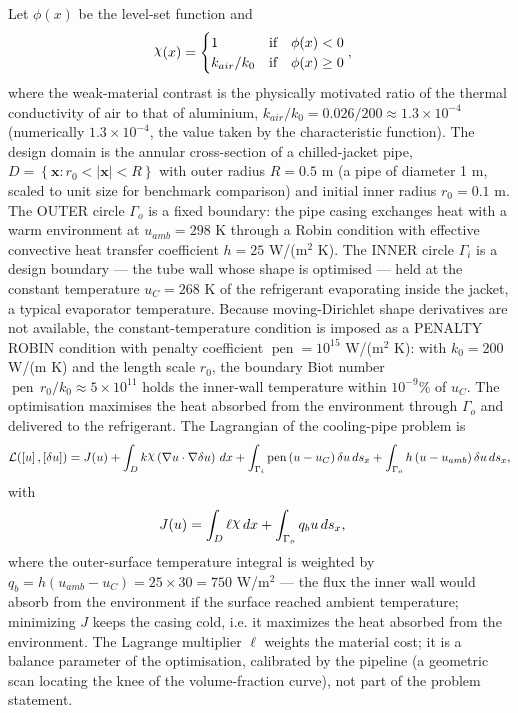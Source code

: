 \documentclass[preview]{standalone}
\let\oldcdot\cdot
\let\cdot\oldcdot
\begin{document}
Let $\phi(x)$ be the level-set function and
 \begin{align*}\raisebox{\depth}{$\chi$}(x) &= \begin{cases} 1 & \mbox{if}\quad \phi(x) < 0 \\ k_{air}/k_0 & \mbox{if}\quad \phi(x)  \ge 0 \end{cases},\end{align*}
where the weak-material contrast is the physically motivated ratio of the thermal conductivity of air to that of aluminium, $k_{air}/k_0 = 0.026/200 \approx 1.3 \times 10^{-4}$ (numerically $1.3 \times 10^{-4}$, the value taken by the characteristic function).
The design domain is the annular cross-section of a chilled-jacket pipe, $D = \left\{ \mathbf x : r_0 < \left|\mathbf x\right| < R \right\}$ with outer radius $R = 0.5$ m (a pipe of diameter 1 m, scaled to unit size for benchmark comparison) and initial inner radius $r_0 = 0.1$ m.  The OUTER circle $\Gamma_o$ is a fixed boundary: the pipe casing exchanges heat with a warm environment at $u_{amb} = 298$ K through a Robin condition with effective convective heat transfer coefficient $h = 25$ W/(m$^{2}$ K).  The INNER circle $\Gamma_i$ is a design boundary — the tube wall whose shape is optimised — held at the constant temperature $u_C = 268$ K of the refrigerant evaporating inside the jacket, a typical evaporator temperature.  Because moving-Dirichlet shape derivatives are not available, the constant-temperature condition is imposed as a PENALTY ROBIN condition with penalty coefficient $\operatorname{pen} = 10^{15}$ W/(m$^{2}$ K): with $k_0 = 200$ W/(m K) and the length scale $r_0$, the boundary Biot number $\operatorname{pen}\, r_0 / k_0 \approx 5 \times 10^{11}$ holds the inner-wall temperature within $10^{-9}\%$ of $u_C$.  The optimisation maximises the heat absorbed from the environment through $\Gamma_o$ and delivered to the refrigerant.
The Lagrangian of the cooling-pipe problem is
\begin{dmath*}
\mathcal L(\left[ u\right],\left[ \delta u\right]) = J(u) +  \int_{D} k \raisebox{\depth}{$\chi$} \left(  \nabla u  \cdot  \nabla \delta u  \right) \,dx + \int_{\Gamma_i} \operatorname{pen} \left( u - u_{C}\right) \delta u \,ds_x + \int_{\Gamma_o} h \left( u - u_{amb}\right) \delta u \,ds_x ,
\end{dmath*}
with
\begin{align*}
J(u) &=  \int_{D} \ell \raisebox{\depth}{$\chi$} \,dx + \int_{\Gamma_o} q_b u \,ds_x ,
 \end{align*}
where the outer-surface temperature integral is weighted by $q_b = h \left( u_{amb} - u_{C}\right) = 25 \times 30 = 750$ W/m$^{2}$ — the flux the inner wall would absorb from the environment if the surface reached ambient temperature; minimizing $J$ keeps the casing cold, i.e. it maximizes the heat absorbed from the environment.  The Lagrange multiplier $\ell$ weights the material cost; it is a balance parameter of the optimisation, calibrated by the pipeline (a geometric scan locating the knee of the volume-fraction curve), not part of the problem statement.
\end{document}
